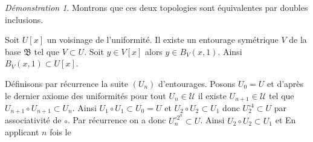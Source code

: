 \documentclass[a4paper, 11pt, french]{book}
\newenvironment{itemise}{\itemize}{\enditemize}
\theoremstyle{plain} %
\theoremstyle{definition} %
\theoremstyle{remark} %
\newtheorem*{demonstration}{Démonstration}
\renewcommand{\setminus}{\backslash}
\newcommand{\1}{\mathds{1}}
\newcommand\et{\text{ et }}
\newcommand{\N}{\mathbb{N}}
\renewcommand{\frak}[1]{\mathfrak{#1}}
\newcommand{\scr}[1]{\mathscr{#1}}
\newcommand\ens[2]{\{#1 \ |\ #2\}}
\begin{document}
\begin{demonstration}
\begin{itemise}
\begin{itemise}
			Montrons que ces deux topologies sont équivalentes par doubles inclusions.
			\begin{itemise}
				\item Soit $U[x]$ un voisinage de l'uniformité.
				Il existe un entourage symétrique $V$ de la base $\frak{B}$ tel que $V\subset U$.
				Soit $y\in V[x]$ alors $y\in B_V(x, 1)$.
				Ainsi $B_V(x, 1)\subset U[x]$.
				\item Définisons par récurrence la suite $(U_n)$ d'entourages.
				Posons $U_0=U$ et d'après le dernier axiome des uniformités pour tout $U_n\in\scr{U}$ il existe $U_{n+1}\in\scr{U}$ tel que $U_{n+1}\circ U_{n+1}\subset U_n$.
				Ainsi $U_1\circ U_1\subset U_0=U$ et $U_2\circ U_2\subset U_1$ donc $U_2^{\circ 4}\subset U$ par associativité de $\circ$.
				Par récurrence on a donc $U_n^{\circ 2^n}\subset U$.
				Ainsi $U_2\circ U_2\subset U_1$ et
				En applicant $n$ fois le
			\end{itemise}
		\end{itemise}
	\end{itemise}
\end{demonstration}
\end{document}
